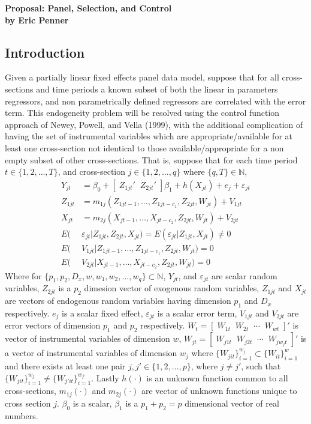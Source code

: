 \documentclass[10pt]{article}
\begin{document}
\doublespacing
\begin{center} 
\Large \bf Proposal: Panel, Selection, and Control \\
 \large by Eric Penner \rm
\end{center} 


\subsection*{Introduction } 
\noindent Given a partially linear fixed effects panel data model, suppose that for all cross-sections and time periods a known subset of both the linear in parameters regressors, and non parametrically defined regressors are correlated with the error term. This endogeneity problem will be resolved using the control function approach of Newey, Powell, and Vella (1999), with the additional complication of having the set of instrumental variables which are appropriate/available for at least one cross-section  not identical to those available/appropriate for a non empty subset of other cross-sections. That is, suppose that for each time period $t \in \{1,2, \ldots, T\}$, and cross-section $j \in \{1,2,\ldots, q\}$ where $\{q,T\} \in \mathbb{N}$, 
\begin{align} 
Y_{jt} &= \beta_0 + [\; Z_{1jt}' \;\; Z_{2jt}' \;] \beta_1 + h(X_{jt}) + e_j + \varepsilon_{jt} \\
%
Z_{1jt} &= m_{1j}(Z_{1jt-1},\ldots,Z_{1jt-c_1},Z_{2jt},W_{jt}) + V_{1jt} \\
%
X_{jt} & = m_{2j}(X_{jt-1},\ldots,X_{jt-c_2},Z_{2jt},W_{jt}) + V_{2jt} \\
%
E(&\varepsilon_{jt} | Z_{1jt} , Z_{2jt} , X_{jt}) = E(\varepsilon_{jt} | Z_{1jt} , X_{jt}) \neq 0  \\
%
E(& V_{1jt} | Z_{1jt-1},\ldots,Z_{1jt-c_1},Z_{2jt},W_{jt}) = 0 \label{eq:V1} \\
%
E(& V_{2jt} | X_{jt-1},\ldots,X_{jt-c_2},Z_{2jt},W_{jt}) = 0 \label{eq:V2}
%
\end{align}
Where for $\{p_1,p_2,D_x,w,w_1,w_2, \ldots ,w_q \} \subset \mathbb{N}$, $Y_{jt}$, and $\varepsilon_{jt}$ are scalar random variables, $ Z_{2jt}$ is a $p_2$ dimesion vector of exogenous random variables, $Z_{1jt}$ and $X_{jt}$ are vectors of endogenous random variables having dimension $p_1$ and $D_x$ respectively. $e_j$ is a scalar fixed effect, $\varepsilon_{jt}$ is a scalar error term, $V_{1jt}$ and $V_{2jt}$ are error vectors of dimension $p_1$ and $p_2$ respectively. $W_t = [ \; W_{1t} \;\; W_{2t} \;\; \cdots \;\; W_{wt} \;]'$ is vector of instrumental variables of dimension $w$, $W_{jt} = [\;W_{j1t} \;\; W_{j2t} \;\; \cdots \;\; W_{jw_jt} \;]'$ is a vector of instrumental variables of dimension $w_j$ where $\{W_{jit}\}_{i=1}^{w_j} \subset \{W_{it}\}_{i=1}^{w}$ and there exists at least one pair $j,j'  \in \{1,2, \ldots , p\}$, where $j \neq j'$, such that $\{W_{jit}\}_{i=1}^{w_j} \neq \{W_{j'it}\}_{i=1}^{w_{j'}}$. Lastly $h(\cdot )$ is an unknown function common to all cross-sections, $m_{1j}(\cdot)$ and $m_{2j}(\cdot)$ are vector of unknown functions unique to cross section $j$. $\beta_0$ is a scalar, $\beta_1$ is a $p_1 +p_2 = p$ dimensional vector of real numbers.\\
\end{document}

